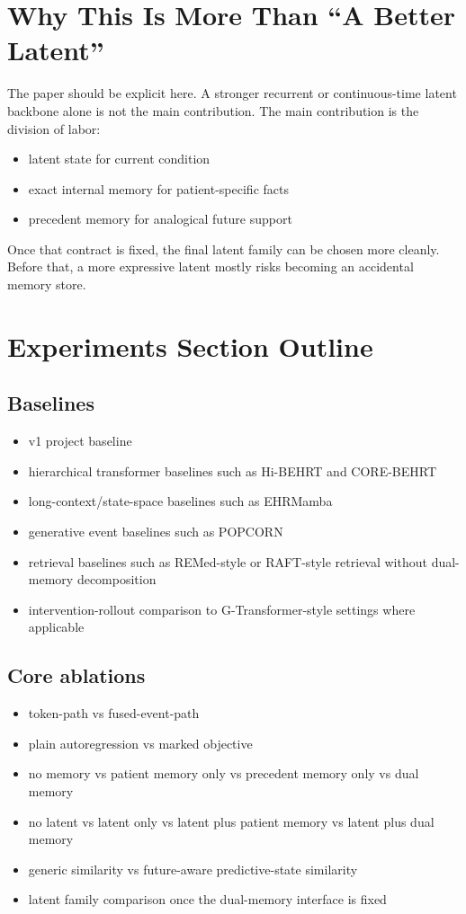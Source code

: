 \documentclass[11pt]{article}
\begin{document}
\section{Why This Is More Than ``A Better Latent''}

The paper should be explicit here. A stronger recurrent or continuous-time
latent backbone alone is not the main contribution. The main contribution is the
division of labor:
\begin{itemize}
    \item latent state for current condition
    \item exact internal memory for patient-specific facts
    \item precedent memory for analogical future support
\end{itemize}

Once that contract is fixed, the final latent family can be chosen more
cleanly. Before that, a more expressive latent mostly risks becoming an
accidental memory store.

\section{Experiments Section Outline}

\subsection{Baselines}

\begin{itemize}
    \item v1 project baseline
    \item hierarchical transformer baselines such as Hi-BEHRT and CORE-BEHRT
    \item long-context/state-space baselines such as EHRMamba
    \item generative event baselines such as POPCORN
    \item retrieval baselines such as REMed-style or RAFT-style retrieval without dual-memory decomposition
    \item intervention-rollout comparison to G-Transformer-style settings where applicable
\end{itemize}

\subsection{Core ablations}

\begin{itemize}
    \item token-path vs fused-event-path
    \item plain autoregression vs marked objective
    \item no memory vs patient memory only vs precedent memory only vs dual memory
    \item no latent vs latent only vs latent plus patient memory vs latent plus dual memory
    \item generic similarity vs future-aware predictive-state similarity
    \item latent family comparison once the dual-memory interface is fixed
\end{itemize}
\end{document}
